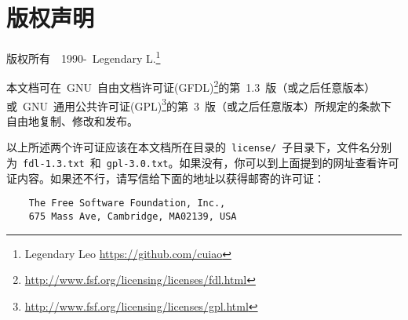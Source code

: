 \cleardoublepage
\chapter{版权声明}
版权所有~\textcopyright~1990-\the\year~Legendary L.\footnote{Legendary Leo \url{https://github.com/cuiao}}

本文档可在~GNU~自由文档许可证(GFDL)\footnote{\url{http://www.fsf.org/licensing/licenses/fdl.html}}的第~1.3~版（或之后任意版本）或~GNU~通用公共许可证(GPL)\footnote{\url{http://www.fsf.org/licensing/licenses/gpl.html}}的第~3~版（或之后任意版本）所规定的条款下自由地复制、修改和发布。


以上所述两个许可证应该在本文档所在目录的~\verb|license/|~\linebreak[1]子目录下，文件名分别为~\verb|fdl-1.3.txt|~和~\verb|gpl-3.0.txt|。如果没有，你可以到上面提到的网址查看许可证内容。如果还不行，请写信给下面的地址以获得邮寄的许可证：
\begin{verbatim}
    The Free Software Foundation, Inc.,
    675 Mass Ave, Cambridge, MA02139, USA
\end{verbatim}
